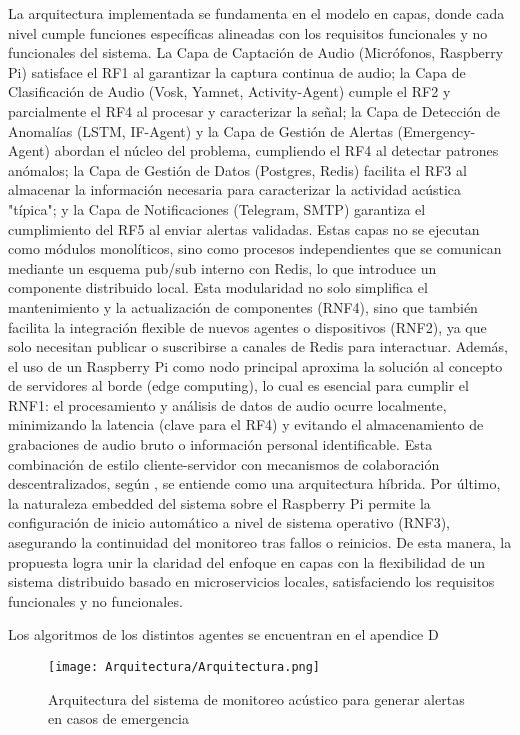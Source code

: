 La arquitectura implementada se fundamenta en el modelo en capas, donde cada nivel cumple funciones específicas alineadas con los requisitos funcionales y no funcionales del sistema. La Capa de Captación de Audio (Micrófonos, Raspberry Pi) satisface el RF1 al garantizar la captura continua de audio; la Capa de Clasificación de Audio (Vosk, Yamnet, Activity-Agent) cumple el RF2 y parcialmente el RF4 al procesar y caracterizar la señal; la Capa de Detección de Anomalías (LSTM, IF-Agent) y la Capa de Gestión de Alertas (Emergency-Agent) abordan el núcleo del problema, cumpliendo el RF4 al detectar patrones anómalos; la Capa de Gestión de Datos (Postgres, Redis) facilita el RF3 al almacenar la información necesaria para caracterizar la actividad acústica "típica"; y la Capa de Notificaciones (Telegram, SMTP) garantiza el cumplimiento del RF5 al enviar alertas validadas. Estas capas no se ejecutan como módulos monolíticos, sino como procesos independientes que se comunican mediante un esquema pub/sub interno con Redis, lo que introduce un componente distribuido local. Esta modularidad no solo simplifica el mantenimiento y la actualización de componentes (RNF4), sino que también facilita la integración flexible de nuevos agentes o dispositivos (RNF2), ya que solo necesitan publicar o suscribirse a canales de Redis para interactuar. Además, el uso de un Raspberry Pi como nodo principal aproxima la solución al concepto de servidores al borde (edge computing), lo cual es esencial para cumplir el RNF1: el procesamiento y análisis de datos de audio ocurre localmente, minimizando la latencia (clave para el RF4) y evitando el almacenamiento de grabaciones de audio bruto o información personal identificable. Esta combinación de estilo cliente-servidor con mecanismos de colaboración descentralizados, según \citeauthor{tanenbaum2007distributed} \citeyear{tanenbaum2007distributed}, se entiende como una arquitectura híbrida. Por último, la naturaleza embedded del sistema sobre el Raspberry Pi permite la configuración de inicio automático a nivel de sistema operativo (RNF3), asegurando la continuidad del monitoreo tras fallos o reinicios. De esta manera, la propuesta logra unir la claridad del enfoque en capas con la flexibilidad de un sistema distribuido basado en microservicios locales, satisfaciendo los requisitos funcionales y no funcionales.

Los algoritmos de los distintos agentes se encuentran en el apendice D

\begin{figure}[ht!]
      \centering
      \texttt{[image: Arquitectura/Arquitectura.png]}
      \caption{Arquitectura del sistema de monitoreo acústico para generar alertas en casos de emergencia}
      \label{fig:arquitectura}
\end{figure}

